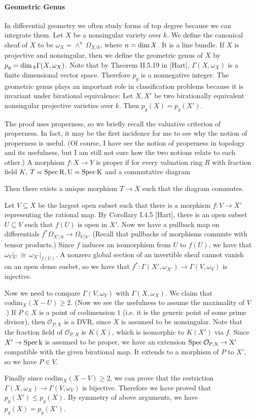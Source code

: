 \documentclass[12pt]{article}
\theoremstyle{plain}
\theoremstyle{definition}
\newcommand{\sO}{\mathcal{O}}
\newcommand{\Spec}{\rm Spec\,}
\renewcommand\dim{{\rm dim\,}}
\newcommand\iso{{\, \cong \,}}
\newcommand{\<}{\langle}
\renewcommand{\>}{\rangle}
\newcommand{\codim}{\mathrm{codim}}
\newcommand{\Ohm}{\Omega}
\newcommand{\w}{\omega}
\begin{document}
\paragraph{Geometric Genus} In differential geometry we often study forms of top degree because we can integrate them. Let $X$ be a nonsingular variety over $k$. We define the canonical sheaf of $X$ to be $\w_X = \wedge^n \, \Ohm_{X/k}$, where $n = \dim X$. It is a line bundle. If $X$ is projective and nonsingular, then we define the geometric genus of $X$ by $p_g = \dim_k \Gamma(X, \w_X)$. Note that by Theorem II.5.19 in [Hart], $\Gamma(X, \w_X)$ is a finite dimensional vector space. Therefore $p_g$ is a nonnegative integer. The geometric genus plays an important role in classification problems because it is invariant under birational equivalence: Let $X, X'$ be two birationally equivalent nonsingular projective varieties over $k$. Then $p_g(X) = p_g(X')$. 

The proof uses properness, so we briefly recall the valuative criterion of properness. In fact, it may be the first incidence for me to see why the notion of properness is useful. (Of course, I have see the notion of properness in topology and its usefulness, but I am still not sure how the two notions relate to each other.) A morphism $f : X \to Y$ is proper if for every valuation ring $R$ with fraction field $K$, $T = \Spec R, U = \Spec K$ and a commutative diagram 
\begin{center}
\end{center}
Then there exists a unique morphism $T \to X$ such that the diagram commutes. 

Let $V \subseteq X$ be the largest open subset such that there is a morphism $f : V \to X'$ representing the rational map. By Corollary I.4.5 [Hart], there is an open subset $U \subseteq V$ such that $f(U)$ is open in $X'$. Now we have a pullback map on differentials $f^* \Ohm_{X'/k} \to \Ohm_{V/k}$. (Recall that pullbacks of morphisms commute with tensor products.) Since $f$ induces an isomorphism from $U$ to $f(U)$, we have that $\w_V |_U \iso \w_{X'}|_{f(U)}$. A nonzero global section of an invertible sheaf cannot vanish on an open dense susbet, so we have that $f^* : \Gamma(X', \w_{X'}) \to \Gamma(V, \w_V)$ is injective. 

Now we need to compare $\Gamma(V, \w_V)$ with $\Gamma(X,\w_X)$. We claim that $\codim_X(X - U) \ge 2$. (Now we see the usefulness to assume the maximality of $V$.) If $P \in X$ is a point of codimension $1$ (i.e. it is the generic point of some prime divisor), then $\sO_{P, X}$ is a DVR, since $X$ is assumed to be nonsingular. Note that the fraction field of $\sO_{P, X}$ is $K(X)$, which is isomorphic to $K(X')$ via $f$. Since $X' \to \Spec k$ is assumed to be proper, we have an extension $\Spec \sO_{P, X} \to X'$ compatible with the given birational map. It extends to a morphism of $P$ to $X'$, so we have $P \in V$. 

Finally since $\codim_X(X - V) \ge 2$, we can prove that the restriction $\Gamma(X, \w_X) \to \Gamma(V, \w_V)$ is bijective. Therefore we have proved that $p_g(X') \le p_g(X)$. By symmetry of above arguments, we have $p_g(X) = p_g(X')$. 
\end{document}
